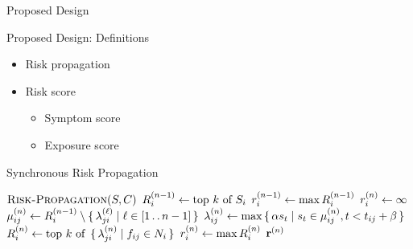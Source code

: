 \documentclass[12pt]{beamer}
\begin{document}
\begin{section}{Proposed Design}

\begin{frame}{Proposed Design: Definitions}
  \begin{itemize}
    \item Risk propagation
    \item Risk score
      \begin{itemize}
        \item Symptom score
        \item Exposure score
      \end{itemize}
  \end{itemize}
\end{frame}

\begin{frame}{Synchronous Risk Propagation}
\begin{spacing}{1.4}
\begin{algorithmic}[1]
    \item[$\Call{\nRiskPropagation}{\vScores, \vContacts}$]
    \State $R_{i}^{(n - 1)} \leftarrow \text{top } k \text{ of } S_i$
    \State $r_{i}^{(n - 1)} \leftarrow \max R_{i}^{(n - 1)}$
    \State $r_{i}^{(n)} \leftarrow \infty$
      \State $\mu_{ij}^{(n)} \leftarrow R_{i}^{(n - 1)} \setminus \set{ \lambda_{ji}^{(\ell)} | \ell \in [1 \mathinner{\ldotp \ldotp} n - 1]}$
      \State $\lambda_{ij}^{(n)} \leftarrow \max \set{ \alpha s_t| s_t\in \mu_{ij}^{(n)}, t< t_{ij} + \beta}$
      \State $\vRiskScores{i}{n} \assign \topK{\setBuilder{\vFactorMessage{j}{i}{n}}{\vFactor[ij] \in \vNeighbors_i}}$
      \State $r_{i}^{(n)} \leftarrow \max R_{i}^{(n)}$
    \EndWhile
    \State \Return $\mathbf{r}^{(n)}$
  \end{algorithmic}
\end{spacing}
\end{frame}

\end{section}
\end{document}
